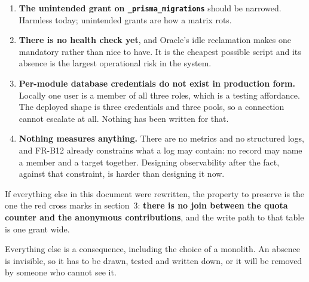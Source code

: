 \documentclass[11pt,a4paper]{article}
\begin{document}
\begin{enumerate}[leftmargin=*,itemsep=1.5mm]
\item \textbf{The unintended grant on \texttt{\_prisma\_migrations}} should be
  narrowed. Harmless today; unintended grants are how a matrix rots.

\item \textbf{There is no health check yet}, and Oracle's idle reclamation
  makes one mandatory rather than nice to have. It is the cheapest possible
  script and its absence is the largest operational risk in the system.

\item \textbf{Per-module database credentials do not exist in production
  form.} Locally one user is a member of all three roles, which is a testing
  affordance. The deployed shape is three credentials and three pools, so a
  connection cannot escalate at all. Nothing has been written for that.

\item \textbf{Nothing measures anything.} There are no metrics and no
  structured logs, and FR-B12 already constrains what a log may contain: no
  record may name a member and a target together. Designing observability after
  the fact, against that constraint, is harder than designing it now.
\end{enumerate}

\vfill
\begin{center}
\begin{tcolorbox}[width=0.94\textwidth,colback=studenslt,colframe=studens,
  arc=2pt,fonttitle=\sffamily\bfseries,title={The one thing to keep}]
\sffamily\small
If everything else in this document were rewritten, the property to preserve is
the one the red cross marks in section~3: \textbf{there is no join between the
quota counter and the anonymous contributions}, and the write path to that table
is one grant wide.

Everything else is a consequence, including the choice of a monolith. An absence
is invisible, so it has to be drawn, tested and written down, or it will be
removed by someone who cannot see it.
\end{tcolorbox}
\end{center}
\end{document}
